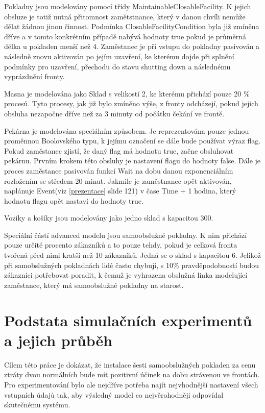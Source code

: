 \documentclass[12pt,a4paper,titlepage]{article}
\begin{document}
Pokladny jsou modelovány pomocí třídy MaintainableClosableFacility. K jejich obsluze je totiž nutná přitomnost zamětstnance, který v danou chvíli nemůže dělat žádnou jinou činnost. Podmínka ClosableFacilityCondition byla již zmíněna dříve a v tomto konkrétním případě nabývá hodnoty true pokud je průměrná délka u pokladen menší než 4. Zaměstanec je při vstupu do pokladny pasivován a následně znovu aktivován po jejím uzavření, ke kterému dojde při splnění podmínky pro uzavření, přechodu do stavu shutting down a následnému vyprázdnění fronty. 

Masna je modelována jako Sklad s velikostí 2, ke kterému přichází pouze 20 \%  procesů. Tyto procesy, jak již bylo zmíněno výše, z fronty odcházejí, pokud jejich obsluha nezapočne dříve než za 3 minuty od počátku čekání ve frontě. 

Pekárna je modelována speciálním způsobem. Je reprezentována pouze jednou proměnnou Boolovského typu, k jejímu označení se dále bude používat výraz flag. Pokud zaměstanec zjistí, že daný flag má hodnotu true, začne obsluhovat pekárnu.  Prvním krokem této obsluhy je  nastavení flagu do hodnoty false. Dále je proces zaměstance pasivován funkcí Wait na dobu danou exponenciálním rozložením se středem 20 minut. Jakmile je zaměstnanec opět aktivován, naplánuje Event(viz \ref{prezentace} slide 121) v čase Time + 1 hodina, který hodnotu flagu opět nastaví do hodnoty true. 

Vozíky a košíky jsou modelovány jako jedno sklad s kapacitou 300. 

Speciální částí advanced modelu jsou samoobslužné pokladny. K nim přichází pouze určité procento zákazníků a to pouze tehdy, pokud je celková fronta tvořená před nimi kratší než 10 zákazníků. Jedná se o sklad s kapacitou 6. Jelikož při samobslužných pokladnách lidé často chybují, s 10\%  pravděpodobností budou zákazníci potřebovat poradit, k čemuž je vyhrazena obslužná linka modelující zaměstance, který má samoobslužné pokladny na starost.  


\section{Podstata simulačních experimentů a jejich průběh}
Cílem této práce je dokázat, že instalace šesti samoobslužných pokladen za cenu ztráty dvou normálních bude mít pozitivní účinek na dobu strávenou ve frontách. Pro experimentování bylo ale nejdříve potřeba najít nejvhodnější nastavení všech vstupních údajů tak, aby výsledný model co nejvěrohodněji odpovídal skutečnému systému. 
\end{document}
